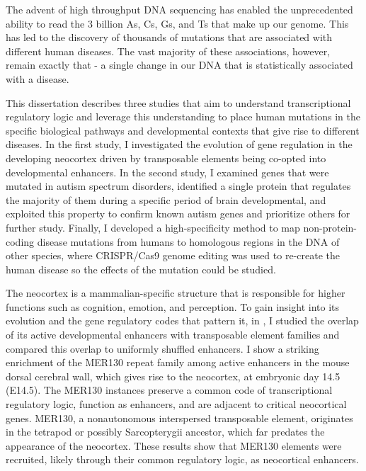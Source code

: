 The advent of high throughput DNA sequencing has enabled the unprecedented  ability to read the 3 billion As, Cs, Gs, and Ts that make up our genome. This has led to the discovery of thousands of mutations that are  associated with different human diseases. The vast majority of these associations, however, remain exactly that - a single change in our DNA that is statistically associated with a disease. 

This dissertation describes three studies that aim to understand transcriptional regulatory logic and leverage this understanding to place human mutations in the specific  biological pathways and developmental contexts that give rise to different diseases. In the first study, I investigated the evolution of gene regulation in the developing neocortex driven by transposable elements being co-opted into developmental enhancers. In the second study, I examined genes that were mutated in autism spectrum disorders, identified a single protein that regulates the majority of them during a specific period of brain developmental, and exploited this property to confirm known autism genes and prioritize others for further study. Finally, I developed a high-specificity method to map non-protein-coding disease mutations from humans to homologous regions in the DNA of other species, where CRISPR/Cas9 genome editing was used to re-create the human disease so the effects of the mutation could be studied.

The neocortex is a mammalian-specific structure that is responsible for higher functions such as cognition, emotion, and perception. To gain insight into its evolution and the gene regulatory codes that pattern it, in , I studied the overlap of its active developmental enhancers with transposable element families and compared this overlap to uniformly shuffled enhancers. I show a striking enrichment of the MER130 repeat family among active enhancers in the mouse dorsal cerebral wall, which gives rise to the neocortex, at embryonic day 14.5 (E14.5). The MER130 instances preserve a common code of transcriptional regulatory logic, function as enhancers, and are adjacent to critical neocortical genes. MER130, a nonautonomous interspersed transposable element, originates in the tetrapod or possibly Sarcopterygii ancestor, which far predates the appearance of the neocortex. These results show that MER130 elements were recruited, likely through their common regulatory logic, as neocortical enhancers.

